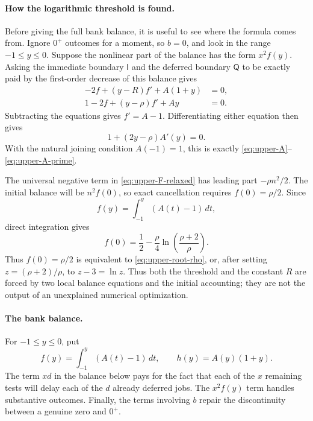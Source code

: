 \paragraph{How the logarithmic threshold is found.}
Before giving the full bank balance, it is useful to see where the formula
comes from.  Ignore $0^+$ outcomes for a moment, so $b=0$, and look in the
range $-1\le y\le0$.  Suppose the nonlinear part of the balance has the form
$x^2f(y)$.  Asking the immediate boundary $\mathsf I$ and the deferred
boundary $\mathsf Q$ to be exactly paid by the first-order decrease of this
balance gives
\begin{align}
 -2f+(y-R)f'+A(1+y)&=0,\label{eq:upper-design-I}\\
 1-2f+(y-\rho)f'+Ay&=0.\label{eq:upper-design-Q}
\end{align}
Subtracting the equations gives $f'=A-1$.  Differentiating either equation
then gives
\[
 1+(2y-\rho)A'(y)=0.
\]
With the natural joining condition $A(-1)=1$, this is exactly
\eqref{eq:upper-A}--\eqref{eq:upper-A-prime}.

The universal negative term in \eqref{eq:upper-F-relaxed} has leading
part $-\rho n^2/2$.  The initial balance will be $n^2f(0)$, so exact
cancellation requires $f(0)=\rho/2$.  Since
\begin{equation}
\label{eq:upper-f-definition}
 f(y)=\int_{-1}^{y}(A(t)-1)\,dt,
\end{equation}
direct integration gives
\[
 f(0)=\frac12-\frac{\rho}{4}
       \ln\!\left(\frac{\rho+2}{\rho}\right).
\]
Thus $f(0)=\rho/2$ is equivalent to
\eqref{eq:upper-root-rho}, or, after setting $z=(\rho+2)/\rho$, to
$z-3=\ln z$.  Thus both the threshold and the constant $R$ are forced by
two local balance equations and the initial accounting; they are not the
output of an unexplained numerical optimization.

\paragraph{The bank balance.}
For $-1\le y\le0$, put
\begin{equation}
\label{eq:upper-fh}
 f(y)=\int_{-1}^{y}(A(t)-1)\,dt,
 \qquad
 h(y)=A(y)(1+y).
\end{equation}
The term $x d$ in the balance below pays for the fact that each of the $x$
remaining tests will delay each of the $d$ already deferred jobs.  The
$x^2f(y)$ term handles substantive outcomes.  Finally, the terms involving
$b$ repair the discontinuity between a genuine zero and $0^+$.

